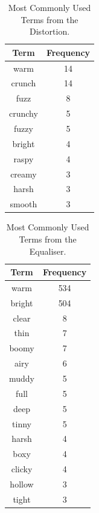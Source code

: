 		\begin{table}[h!]
			\centering
			\begin{tabular}{|c|c|}
				\hline
				\bf{Term} & \bf{Frequency} \\
				\hline
				\hline
				warm & 14 \\
				\hline
				crunch & 14 \\
				\hline
				fuzz & 8 \\
				\hline
				crunchy & 5 \\
				\hline
				fuzzy & 5 \\
				\hline
				bright & 4 \\
				\hline
				raspy & 4 \\
				\hline
				creamy & 3 \\
				\hline
				harsh & 3 \\
				\hline
				smooth & 3 \\
				\hline
			\end{tabular}
			\caption{Most Commonly Used Terms from the Distortion.}
			\label{tab:DistortionTerms}
		\end{table}

		\begin{table}[h!]
			\centering
			\begin{tabular}{|c|c|}
				\hline
				\bf{Term} & \bf{Frequency} \\
				\hline
				\hline
				warm & 534 \\
				\hline
				bright & 504 \\
				\hline
				clear & 8 \\
				\hline
				thin & 7 \\
				\hline
				boomy & 7 \\
				\hline
				airy & 6 \\
				\hline
				muddy & 5 \\
				\hline
				full & 5 \\
				\hline
				deep & 5 \\
				\hline
				tinny & 5 \\
				\hline
				harsh & 4 \\
				\hline
				boxy & 4 \\
				\hline
				clicky & 4 \\
				\hline
				hollow & 3 \\
				\hline
				tight & 3 \\
				\hline
			\end{tabular}
			\caption{Most Commonly Used Terms from the Equaliser.}
			\label{tab:EquaiserTerms}
		\end{table}

